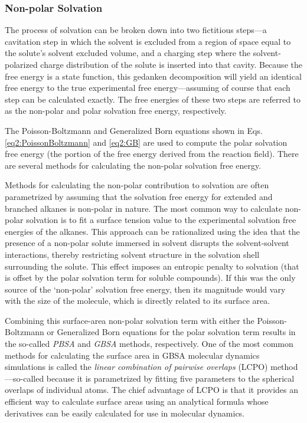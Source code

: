 \subsubsection{Non-polar Solvation}

The process of solvation can be broken down into two fictitious steps---a
cavitation step in which the solvent is excluded from a region of space equal to
the solute's solvent excluded volume, and a charging step where the
solvent-polarized charge distribution of the solute is inserted into that
cavity. Because the free energy is a state function, this gedanken decomposition
will yield an identical free energy to the true experimental free
energy---assuming of course that each step can be calculated exactly.  The free
energies of these two steps are referred to as the non-polar and polar solvation
free energy, respectively.

The Poisson-Boltzmann and Generalized Born equations shown in Eqs.
\ref{eq2:PoissonBoltzmann} and \ref{eq2:GB} are used to compute the polar
solvation free energy (\ie the portion of the free energy derived from the
reaction field). There are several methods for calculating the non-polar
solvation free energy.

Methods for calculating the non-polar contribution to solvation are often
parametrized by assuming that the solvation free energy for extended and
branched alkanes is non-polar in nature. The most common way to calculate
non-polar solvation is to fit a surface tension value to the experimental
solvation free energies of the alkanes.
\cite{Cramer_Book_EssentialsCompChem_2004} This approach can be rationalized
using the idea that the presence of a non-polar solute immersed in solvent
disrupts the solvent-solvent interactions, thereby restricting solvent structure
in the solvation shell surrounding the solute. This effect imposes an entropic
penalty to solvation (that is offset by the polar solvation term for soluble
compounds).  If this was the only source of the `non-polar' solvation free
energy, then its magnitude would vary with the size of the molecule, which is
directly related to its surface area.

Combining this surface-area non-polar solvation term with either the
Poisson-Boltzmann or Generalized Born equations for the polar solvation term
results in the so-called \emph{PBSA} and \emph{GBSA} methods, respectively. One
of the most common methods for calculating the surface area in GBSA molecular
dynamics simulations is called the \emph{linear combination of pairwise
overlaps} (LCPO) method---so-called because it is parametrized by fitting five
parameters to the spherical overlaps of individual atoms.
\cite{Weiser_JComputChem_1999_v20_p217} The chief advantage of LCPO is that it
provides an efficient way to calculate surface areas using an analytical formula
whose derivatives can be easily calculated for use in molecular dynamics.

